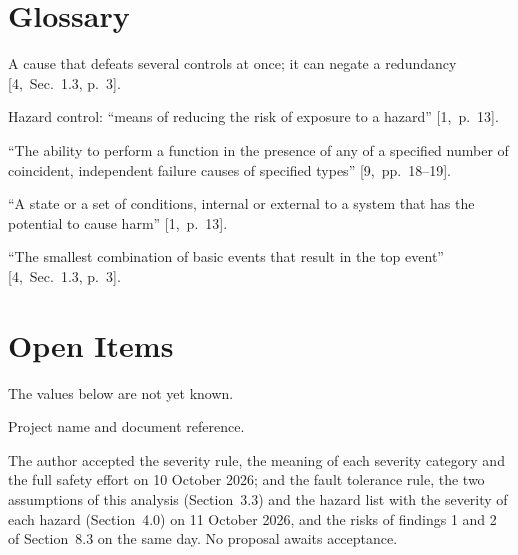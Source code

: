 \documentclass[11pt,a4paper]{article}
\newcommand{\tbditem}[2]{\refstepcounter{tbd}\label{tbd:#1}\item[TBD-\thetbd] #2}
\begin{document}
\section{Glossary}
\begin{description}[leftmargin=3.4cm]
\item[Common cause] A cause that defeats several controls at once; it can
  negate a redundancy [4,~Sec.~1.3, p.~3].
\item[Control] Hazard control: ``means of reducing the risk of exposure to a
  hazard'' [1,~p.~13].
\item[Fault tolerance] ``The ability to perform a function in the presence of
  any of a specified number of coincident, independent failure causes of
  specified types'' \mbox{[9,~pp.~18--19]}.
\item[Hazard] ``A state or a set of conditions, internal or external to a
  system that has the potential to cause harm'' [1,~p.~13].
\item[Minimal cut set] ``The smallest combination of basic events that result
  in the top event'' [4,~Sec.~1.3, p.~3].
\end{description}

\section{Open Items}
The values below are not yet known.
\begin{description}
\tbditem{ref}{Project name and document reference.}

\end{description}

\medskip
\noindent The author accepted the severity rule, the meaning of each severity
category and the full safety effort on 10 October 2026; and the fault
tolerance rule, the two assumptions of this analysis (Section~3.3) and the
hazard list with the severity of each hazard (Section~4.0) on 11 October 2026,
and the risks of findings 1 and 2 of Section~8.3 on the same day.
No proposal awaits acceptance.
\end{document}
